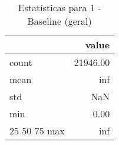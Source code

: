 \begin{table}[htbp]
\caption{Estatísticas para 1 - Baseline (geral)}
\label{tab:1_-_baseline_(geral)_summary}
\begin{tabular}{lr}
\toprule
 & value \\
\midrule
count & 21946.00 \\
mean & inf \\
std & NaN \\
min & 0.00 \\
25%
50%
75%
max & inf \\
\bottomrule
\end{tabular}
\end{table}
